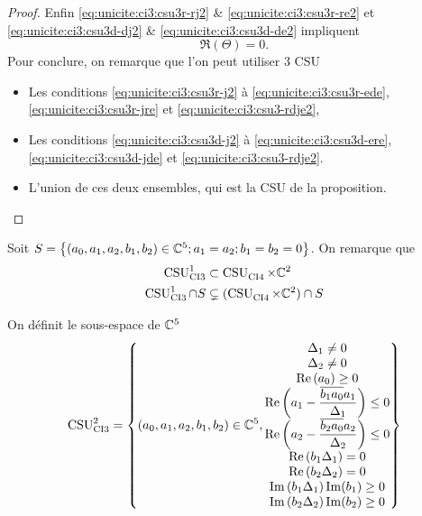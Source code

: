 \begin{proof}
    Enfin \eqref{eq:unicite:ci3:csu3r-rj2} \& \eqref{eq:unicite:ci3:csu3r-re2} et \eqref{eq:unicite:ci3:csu3d-dj2} \& \eqref{eq:unicite:ci3:csu3d-de2} impliquent
    \begin{equation}
      \label{eq:unicite:ci3:csu3-rdje2}
      \Re\left(\Theta\right) = 0.
    \end{equation}
    Pour conclure, on remarque que l'on peut utiliser 3 CSU
    \begin{itemize}
      \item Les conditions \eqref{eq:unicite:ci3:csu3r-j2} à \eqref{eq:unicite:ci3:csu3r-ede}, \eqref{eq:unicite:ci3:csu3r-jre} et \eqref{eq:unicite:ci3:csu3-rdje2},
      \item Les conditions \eqref{eq:unicite:ci3:csu3d-j2} à \eqref{eq:unicite:ci3:csu3d-ere}, \eqref{eq:unicite:ci3:csu3d-jde} et \eqref{eq:unicite:ci3:csu3-rdje2}. 
      \item L'union de ces deux ensembles, qui est la CSU de la proposition.
    \end{itemize}
  \end{proof}

  Soit \(S = \left\lbrace (a_0,a_1,a_2,b_1,b_2) \in \CC^5 ; a_1 = a_2 ; b_1 = b_2 = 0 \right\rbrace \). On remarque que
  \begin{align}
    \CSU[1]{CI3} & \subset \CSU{CI4}\times\CC^2
    \\
    \CSU[1]{CI3}\cap S & \subsetneq (\CSU{CI4}\times\CC^2)\cap S 
  \end{align}

  \begin{defn}
    \label{def:csu:ci3-2}

    On définit le sous-espace de \(\CC^5\)
    \begin{equation*}
      \CSU[2]{CI3} = \left\lbrace 
      (a_0,a_1,a_2,b_1,b_2) \in \CC^5,
      \begin{matrix}
      \Delta_1 \not = 0
      \\
      \Delta_2 \not = 0
      \\
      \Re\left(a_0\right)\ge 0
      \\
      \Re\left(a_1 - \frac{\conj{b_1a_0}a_1}{\Delta_1}\right) \le 0
      \\
      \Re\left(a_2 - \frac{\conj{b_2a_0}a_2}{\Delta_2}\right) \le 0
      \\
      \Re\left(b_1\Delta_1\right) = 0
      \\
      \Re\left(b_2\Delta_2\right) = 0
      \\
      \Im\left(b_1\Delta_1\right)\Im(b_1)\ge 0
      \\
      \Im\left(b_2\Delta_2\right)\Im(b_2)\ge 0
      \end{matrix}
      \right\rbrace
    \end{equation*}
  \end{defn}

